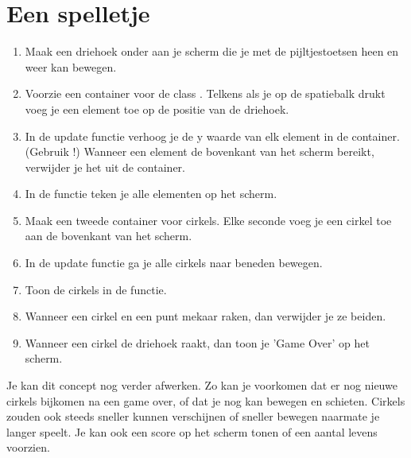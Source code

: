 \section{Een spelletje}

\begin{enumerate}
\item Maak een driehoek onder aan je scherm die je met de pijltjestoetsen heen en weer kan bewegen.
\item Voorzie een container voor de class . Telkens als je op de spatiebalk drukt voeg je een element toe op de positie van de driehoek.
\item In de update functie verhoog je de y waarde van elk element in de container. (Gebruik !) Wanneer een element de bovenkant van het scherm bereikt, verwijder je het uit de container.
\item In de  functie teken je alle elementen op het scherm.
\item Maak een tweede container voor cirkels. Elke seconde voeg je een cirkel toe aan de bovenkant van het scherm.
\item In de update functie ga je alle cirkels naar beneden bewegen.
\item Toon de cirkels in de  functie.
\item Wanneer een cirkel en een punt mekaar raken, dan verwijder je ze beiden.
\item Wanneer een cirkel de driehoek raakt, dan toon je 'Game Over' op het scherm.
\end{enumerate}

Je kan dit concept nog verder afwerken. Zo kan je voorkomen dat er nog nieuwe cirkels bijkomen na een game over, of dat je nog kan bewegen en schieten. Cirkels zouden ook steeds sneller kunnen verschijnen of sneller bewegen naarmate je langer speelt. Je kan ook een score op het scherm tonen of een aantal levens voorzien.
